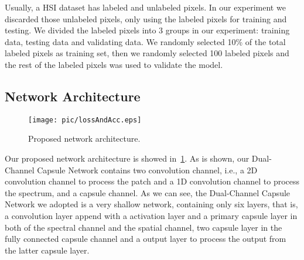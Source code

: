\documentclass{article}
\begin{document}
	Usually, a HSI dataset has labeled and unlabeled pixels.
	In our experiment we discarded those unlabeled pixels, only using the labeled pixels for training and testing.
	We divided the labeled pixels into 3 groups in our experiment: training data, testing data and validating data.
	We randomly selected 10\% of the total labeled pixels as training set, then we randomly selected 100 labeled pixels
	and the rest of the labeled pixels was used to validate the model.

	\subsection{Network Architecture}\label{subsec:network-architecture}
	\begin{figure}[!ht]
		\centering
		\texttt{[image: pic/lossAndAcc.eps]}
		\caption{Proposed network architecture.}
		\label{netArct}
	\end{figure}
	Our proposed network architecture is showed in~\ref{netArct}.
	As is shown, our Dual-Channel Capsule Network contains two convolution channel, i.e., a 2D convolution channel to
	process the patch and a 1D convolution channel to process the spectrum, and a capsule channel.
	As we can see, the Dual-Channel Capsule Network we adopted is a very shallow network, containing only six layers,
	that is, a convolution layer append with a activation layer and a primary capsule layer in both of the spectral
	channel and the spatial channel, two capsule layer in the fully connected capsule channel and a output layer to
	process the output from the latter capsule layer.
\end{document}
